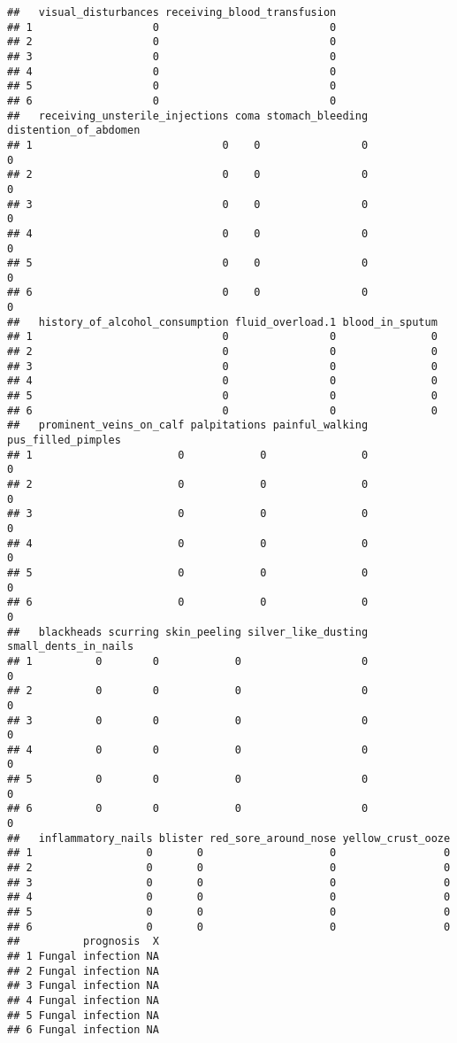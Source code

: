 \documentclass[
]{article}
\begin{document}
\begin{verbatim}
##   visual_disturbances receiving_blood_transfusion
## 1                   0                           0
## 2                   0                           0
## 3                   0                           0
## 4                   0                           0
## 5                   0                           0
## 6                   0                           0
##   receiving_unsterile_injections coma stomach_bleeding distention_of_abdomen
## 1                              0    0                0                     0
## 2                              0    0                0                     0
## 3                              0    0                0                     0
## 4                              0    0                0                     0
## 5                              0    0                0                     0
## 6                              0    0                0                     0
##   history_of_alcohol_consumption fluid_overload.1 blood_in_sputum
## 1                              0                0               0
## 2                              0                0               0
## 3                              0                0               0
## 4                              0                0               0
## 5                              0                0               0
## 6                              0                0               0
##   prominent_veins_on_calf palpitations painful_walking pus_filled_pimples
## 1                       0            0               0                  0
## 2                       0            0               0                  0
## 3                       0            0               0                  0
## 4                       0            0               0                  0
## 5                       0            0               0                  0
## 6                       0            0               0                  0
##   blackheads scurring skin_peeling silver_like_dusting small_dents_in_nails
## 1          0        0            0                   0                    0
## 2          0        0            0                   0                    0
## 3          0        0            0                   0                    0
## 4          0        0            0                   0                    0
## 5          0        0            0                   0                    0
## 6          0        0            0                   0                    0
##   inflammatory_nails blister red_sore_around_nose yellow_crust_ooze
## 1                  0       0                    0                 0
## 2                  0       0                    0                 0
## 3                  0       0                    0                 0
## 4                  0       0                    0                 0
## 5                  0       0                    0                 0
## 6                  0       0                    0                 0
##          prognosis  X
## 1 Fungal infection NA
## 2 Fungal infection NA
## 3 Fungal infection NA
## 4 Fungal infection NA
## 5 Fungal infection NA
## 6 Fungal infection NA
\end{verbatim}
\end{document}
